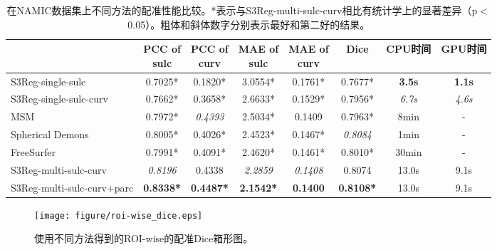 \begin{table}[h]
		\caption{在NAMIC数据集上不同方法的配准性能比较。*表示与S3Reg-multi-sulc-curv相比有统计学上的显著差异（p$<$0.05）。粗体和斜体数字分别表示最好和第二好的结果。}
		\label{tab:NAMIC成人数据集的配准结果比较}
		\centering
		\begin{tabularx}{\linewidth}{l|c|c|c|c|c|c|c}
			\hline
			&       \makecell{PCC of\\ sulc}         &     \makecell{PCC of\\ curv}          &     \makecell{MAE of\\ sulc}  &         \makecell{MAE of\\ curv}     & Dice                     & CPU时间 & GPU时间 \\
			\hline
			S3Reg-single-sulc           &   0.7025*	        &   0.1820*	        &  3.0554*	       &  0.1761*	     &   0.7677*	        &    \textbf{3.5s} & \textbf{1.1s} \\
			S3Reg-single-sulc-curv      &	0.7662*	        &  0.3658*           &  	2.6633*         &   0.1529*	     &   0.7956*	        &   \textit{6.7s}  &\textit{4.6s}   \\
			MSM\cite{robinson2014msm}                       &	0.7972*	        &   \textit{0.4393}  &   2.5034*	       &   0.1409	     &   0.7963*	        &   8min           &  -            \\
			Spherical Demons\cite{yeo2009spherical}	        &    0.8005*         &	0.4026*          &   	2.4523*	   &   0.1467*	     &   \textit{0.8084} &   1min           & -             \\
		   FreeSurfer\cite{fischl2012freesurfer}     &    0.7991*         &	0.4091*          &   	2.4620*	   &   0.1461*    &   0.8010* &   30min       & -       \\
			S3Reg-multi-sulc-curv	    &   \textit{0.8196}	&   0.4338           &  	\textit{2.2859} & \textit{0.1408}	 &   0.8074	        &   13.0s          &   9.1s        \\
			S3Reg-multi-sulc-curv+parc	& 	\textbf{0.8338*}	& \textbf{0.4487*}	& \textbf{2.1542*}  & \textbf{0.1400}  & \textbf{0.8108*}  &   13.0s          &   9.1s        \\		
			\hline
		\end{tabularx}
\end{table}

\begin{figure}[h]
	\centering
	\texttt{[image: figure/roi-wise\_dice.eps]}
	\caption{使用不同方法得到的ROI-wise的配准Dice箱形图。}
	\label{fig:registration_roi_wise_dice}
\end{figure}

